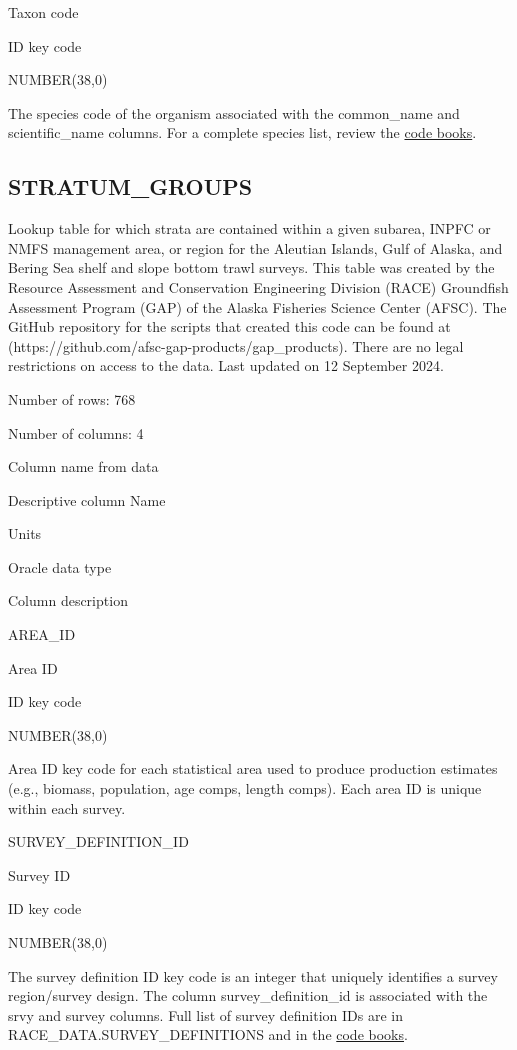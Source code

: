 \documentclass[
  letterpaper,
  oneside,
  open=any]{scrbook}
\begin{document}
Taxon code

ID key code

NUMBER(38,0)

The species code of the organism associated with the common\_name and
scientific\_name columns. For a complete species list, review the
\href{https://www.fisheries.noaa.gov/resource/document/groundfish-survey-species-code-manual-and-data-codes-manual}{code
books}.

\subsection{STRATUM\_GROUPS}\label{stratum_groups}

Lookup table for which strata are contained within a given subarea,
INPFC or NMFS management area, or region for the Aleutian Islands, Gulf
of Alaska, and Bering Sea shelf and slope bottom trawl surveys. This
table was created by the Resource Assessment and Conservation
Engineering Division (RACE) Groundfish Assessment Program (GAP) of the
Alaska Fisheries Science Center (AFSC). The GitHub repository for the
scripts that created this code can be found at
(https://github.com/afsc-gap-products/gap\_products). There are no legal
restrictions on access to the data. Last updated on 12 September 2024.

Number of rows: 768

Number of columns: 4

Column name from data

Descriptive column Name

Units

Oracle data type

Column description

AREA\_ID

Area ID

ID key code

NUMBER(38,0)

Area ID key code for each statistical area used to produce production
estimates (e.g., biomass, population, age comps, length comps). Each
area ID is unique within each survey.

SURVEY\_DEFINITION\_ID

Survey ID

ID key code

NUMBER(38,0)

The survey definition ID key code is an integer that uniquely identifies
a survey region/survey design. The column survey\_definition\_id is
associated with the srvy and survey columns. Full list of survey
definition IDs are in RACE\_DATA.SURVEY\_DEFINITIONS and in the
\href{https://www.fisheries.noaa.gov/resource/document/groundfish-survey-species-code-manual-and-data-codes-manual}{code
books}.
\end{document}
